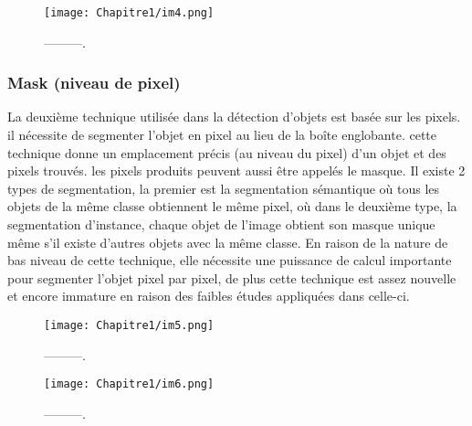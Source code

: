 \begin{figure}[H]
\centering
\texttt{[image: Chapitre1/im4.png]}
\caption{---------.}
\label{im4}
\end{figure}

\subsubsection{Mask (niveau de pixel)}
La deuxième technique utilisée dans la détection d'objets est basée sur les pixels. il nécessite de segmenter l'objet en pixel au lieu de la boîte englobante. cette technique donne un emplacement précis (au niveau du pixel) d'un objet et des pixels trouvés. les pixels produits peuvent aussi être appelés le masque. Il existe 2 types de segmentation, la premier est la segmentation sémantique où tous les objets de la même classe obtiennent le même pixel, où dans le deuxième type, la segmentation d'instance, chaque objet de l'image obtient son masque unique même s'il existe d'autres objets avec la même classe. En raison de la nature de bas niveau de cette technique, elle nécessite une puissance de calcul importante pour segmenter l'objet pixel par pixel, de plus cette technique est assez nouvelle et encore immature en raison des faibles études appliquées dans celle-ci.

\begin{figure}[H]
\centering
\texttt{[image: Chapitre1/im5.png]}
\caption{---------.}
\label{im5}
\end{figure}
\begin{figure}[H]
\centering
\texttt{[image: Chapitre1/im6.png]}
\caption{---------.}
\label{im6}
\end{figure}


